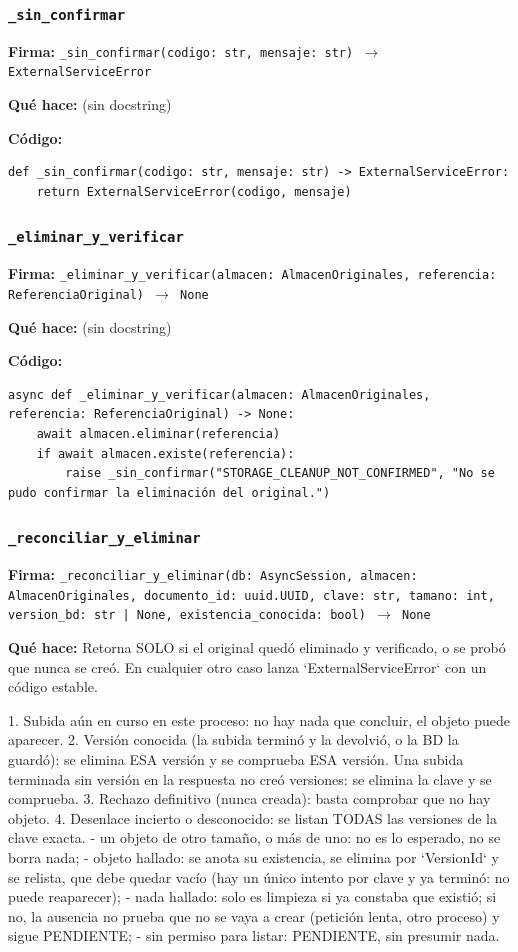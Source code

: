\documentclass[11pt,a4paper]{article}
\begin{document}
\subsubsection*{\texttt{\_sin\_confirmar}}
\textbf{Firma:} \texttt{\_sin\_confirmar(codigo: str, mensaje: str) $\rightarrow$ ExternalServiceError}

\textbf{Qué hace:} (sin docstring)

\textbf{Código:}
\begin{lstlisting}
def _sin_confirmar(codigo: str, mensaje: str) -> ExternalServiceError:
    return ExternalServiceError(codigo, mensaje)
\end{lstlisting}

\subsubsection*{\texttt{\_eliminar\_y\_verificar}}
\textbf{Firma:} \texttt{\_eliminar\_y\_verificar(almacen: AlmacenOriginales, referencia: ReferenciaOriginal) $\rightarrow$ None}

\textbf{Qué hace:} (sin docstring)

\textbf{Código:}
\begin{lstlisting}
async def _eliminar_y_verificar(almacen: AlmacenOriginales, referencia: ReferenciaOriginal) -> None:
    await almacen.eliminar(referencia)
    if await almacen.existe(referencia):
        raise _sin_confirmar("STORAGE_CLEANUP_NOT_CONFIRMED", "No se pudo confirmar la eliminación del original.")
\end{lstlisting}

\subsubsection*{\texttt{\_reconciliar\_y\_eliminar}}
\textbf{Firma:} \texttt{\_reconciliar\_y\_eliminar(db: AsyncSession, almacen: AlmacenOriginales, documento\_id: uuid.UUID, clave: str, tamano: int, version\_bd: str | None, existencia\_conocida: bool) $\rightarrow$ None}

\textbf{Qué hace:} Retorna SOLO si el original quedó eliminado y verificado, o se probó que nunca se creó.
En cualquier otro caso lanza `ExternalServiceError` con un código estable.

1. Subida aún en curso en este proceso: no hay nada que concluir, el objeto puede aparecer.
2. Versión conocida (la subida terminó y la devolvió, o la BD la guardó): se elimina ESA
   versión y se comprueba ESA versión. Una subida terminada sin versión en la respuesta no
   creó versiones: se elimina la clave y se comprueba.
3. Rechazo definitivo (nunca creada): basta comprobar que no hay objeto.
4. Desenlace incierto o desconocido: se listan TODAS las versiones de la clave exacta.
   - un objeto de otro tamaño, o más de uno: no es lo esperado, no se borra nada;
   - objeto hallado: se anota su existencia, se elimina por `VersionId` y se relista, que
     debe quedar vacío (hay un único intento por clave y ya terminó: no puede reaparecer);
   - nada hallado: solo es limpieza si ya constaba que existió; si no, la ausencia no
     prueba que no se vaya a crear (petición lenta, otro proceso) y sigue PENDIENTE;
   - sin permiso para listar: PENDIENTE, sin presumir nada.
\end{document}
